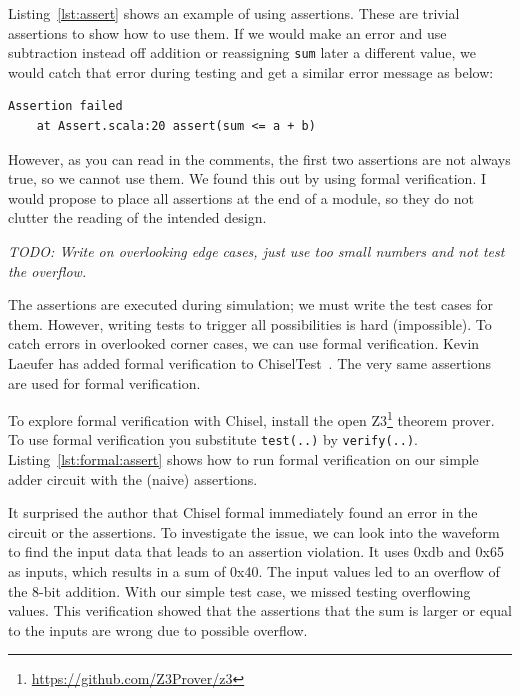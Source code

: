 \documentclass[%
    10pt,
    headinclude, footinclude=false,
    openright, %
    notitlepage,
    cleardoublepage=empty,
    headsepline,
    numbers=noenddot,
    bibliography=totoc, index=totoc,
    ]{scrbook}
\newcommand{\code}[1]{{\lstinline[basicstyle=\small\ttfamily]{#1}}}
\newcommand{\todo}[1]{{\emph{TODO: #1}}}
\newcommand{\myref}[2]{\href{#1}{#2}}
\renewcommand{\myref}[2]{{#2}{\footnote{\url{#1}}}}
\begin{document}

Listing~\ref{lst:assert} shows an example of using assertions. These are trivial assertions
to show how to use them. If we would make an error and use subtraction instead off addition
or reassigning \code{sum} later a different value,
we would catch that error during testing and get a similar error message as below:

\begin{verbatim}
Assertion failed
    at Assert.scala:20 assert(sum <= a + b)
\end{verbatim}

However, as you can read in the comments, the first two assertions
are not always true, so we cannot use them. We found this out by
using formal verification.
I would propose to place all assertions at the end of a module,
so they do not clutter the reading of the intended design.

\todo{Write on overlooking edge cases, just use too small numbers and not
test the overflow.}

The assertions are executed during simulation; we must write the test cases
for them. However, writing tests to trigger all possibilities is hard (impossible).
To catch errors in overlooked corner cases, we can use formal verification.
Kevin Laeufer has added formal verification to ChiselTest~\cite{kevin:formal:woset2021}.
The very same assertions are used for formal verification.

To explore formal verification with Chisel, install
the open \myref{https://github.com/Z3Prover/z3}{Z3} theorem prover.
To use formal verification you substitute \code{test(..)} by \code{verify(..)}.
Listing~\ref{lst:formal:assert} shows how to run formal verification on our
simple adder circuit with the (naive) assertions.

It surprised the author that Chisel formal immediately found an error in the circuit or the assertions.
To investigate the issue, we can look into the waveform to find the input data
that leads to an assertion violation. It uses 0xdb and 0x65 as inputs, which results in
a sum of 0x40. The input values led to an overflow of the 8-bit addition.
With our simple test case, we missed testing overflowing values.
This verification showed that the assertions that the sum is larger or equal to
the inputs are wrong due to possible overflow.

\end{document}
